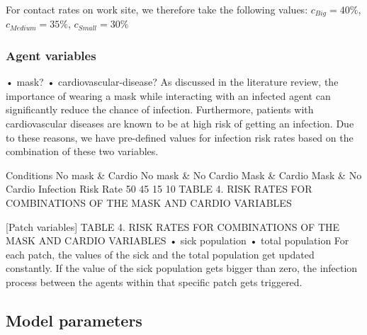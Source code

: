 \documentclass[smallextended]{svjour3}       %
\begin{document}
For contact rates on work site, we therefore take the following values: $c_{Big} = 40\%$, $c_{Medium} = 35\%$, $c_{Small} = 30\%$


\subsubsection{Agent variables}


• mask?
• cardiovascular-disease?
As discussed in the literature review, the importance of wearing a mask while interacting with an infected agent can significantly reduce the chance of infection. Furthermore, patients with cardiovascular diseases are known to be at high risk of getting an infection. Due to these reasons, we have pre-defined values for infection risk rates based on the combination of these two variables.

Conditions
No mask \& Cardio
No mask \& No Cardio
Mask \& Cardio
Mask \& No Cardio
Infection Risk Rate
50 %
45 %
15 %
10 %
TABLE 4. RISK RATES FOR COMBINATIONS OF THE MASK AND CARDIO VARIABLES

[Patch variables]
TABLE 4. RISK RATES FOR COMBINATIONS OF THE MASK AND CARDIO VARIABLES
• sick population
• total population
For each patch, the values of the sick and the total population get updated constantly. If the value of the sick population gets bigger than zero, the infection process between the agents within that specific patch gets triggered.


\subsection{Model parameters}
\end{document}
